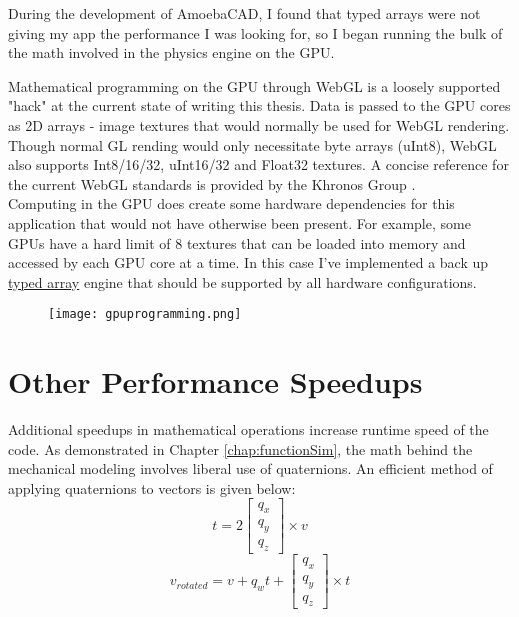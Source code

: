 {During the development of AmoebaCAD, I found that typed arrays were not giving my app the performance I was looking for, so I began running the bulk of the math involved in the physics engine on the GPU.  

Mathematical programming on the GPU through WebGL is a loosely supported "hack" at the current state of writing this thesis.  Data is passed to the GPU cores as 2D arrays - image textures that would normally be used for WebGL rendering.  Though normal GL rending would only necessitate byte arrays (uInt8), WebGL also supports Int8/16/32, uInt16/32 and Float32 textures.
A concise reference for the current WebGL standards is provided by the Khronos Group \cite{Group}.
\\

Computing in the GPU does create some hardware dependencies for this application that would not have otherwise been present.  For example, some GPUs have a hard limit of 8 textures that can be loaded into memory and accessed by each GPU core at a time.  In this case I've implemented a back up \href{https://developer.mozilla.org/en-US/docs/Web/JavaScript/Typed_arrays}{typed array} engine that should be supported by all hardware configurations.

\begin{figure}
  \texttt{[image: gpuprogramming.png]}
  \caption{}
  \label{fig:gpuprogramming}
\end{figure}


\section{Other Performance Speedups}

Additional speedups in mathematical operations increase runtime speed of the code.  As demonstrated in Chapter \ref{chap:functionSim}, the math behind the mechanical modeling involves liberal use of quaternions.  An efficient method of applying quaternions to vectors is given below:\\

\[ t = 2 \left[ \begin{array}{ccc}
q_x\\
q_y\\
q_z
 \end{array} \right] \times v\]
\[ v_{rotated} = v + q_wt +  \left[ \begin{array}{ccc}
q_x\\
q_y\\
q_z
 \end{array} \right] \times t\]
 
}
